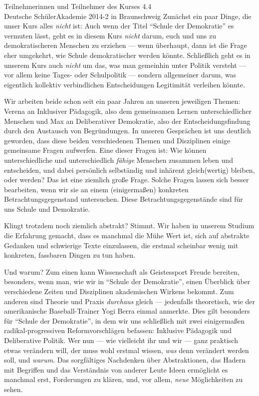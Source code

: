 \documentclass[a4paper]{letter}
\begin{document}
\begin{letter}{
	Teilnehmerinnen und Teilnehmer des Kurses 4.4 \\
	Deutsche SchülerAkademie 2014-2 in Braunschweig}
Zunächst ein paar Dinge, die unser Kurs alles \emph{nicht} ist:
Auch wenn der Titel ``Schule der Demokratie'' es vermuten lässt, geht es in diesem Kurs \emph{nicht} darum, euch und uns zu demokratischeren Menschen zu erziehen --- wenn überhaupt, dann ist die Frage eher umgekehrt, wie Schule demokratischer werden könnte.
Schließlich geht es in unserem Kurs auch \emph{nicht} um das, was man gemeinhin unter Politik versteht --- vor allem keine Tages- oder Schulpolitik --- sondern allgemeiner darum, was eigentlich kollektiv verbindlichen Entscheidungen Legitimität verleihen könnte.

Wir arbeiten beide schon seit ein paar Jahren an unseren jeweiligen Themen: Verena an Inklusiver Pädagogik, also dem gemeinsamen Lernen unterschiedlicher Menschen und Max an Deliberativer Demokratie, also der Entscheidungsfindung durch den Austausch von Begründungen.
In unseren Gesprächen ist uns deutlich geworden, dass diese beiden verschiedenen Themen und Disziplinen einige gemeinsame Fragen aufwerfen.
Eine dieser Fragen ist:
Wie können unterschiedliche und unterschiedlich \emph{fähige} Menschen zusammen leben und entscheiden, und dabei persönlich selbständig und inhärent gleich(wertig) bleiben, oder werden?
Das ist eine ziemlich große Frage.
Solche Fragen lassen sich besser bearbeiten, wenn wir sie an einem (einigermaßen) konkreten Betrachtungsgegenstand untersuchen.
Diese Betrachtungsgegenstände sind für uns Schule und Demokratie.

Klingt trotzdem noch ziemlich abstrakt?
Stimmt. 
Wir haben in unserem Studium die Erfahrung gemacht, dass es manchmal die Mühe Wert ist, sich auf abstrakte Gedanken und schwierige Texte einzulassen, die erstmal scheinbar wenig mit konkreten, fassbaren Dingen zu tun haben.

Und warum? 
Zum einen kann Wissenschaft als Geistessport Freude bereiten, besonders, wenn man, wie wir in ``Schule der Demokratie'', einen Überblick über verschiedene Zeiten und Disziplinen akademischen Wirkens bekommt.
Zum anderen sind Theorie und Praxis \emph{durchaus} gleich --- jedenfalls theoretisch, wie der amerikanische Baseball-Trainer Yogi Berra einmal anmerkte.
Dies gilt besonders für ``Schule der Demokratie'', in dem wir uns schließlich mit zwei einigermaßen radikal-progressiven Reformvorschlägen befassen: Inklusive Pädagogik und Deliberative Politik.
Wer nun --- wie vielleicht ihr und wir --- ganz praktisch etwas verändern will, der muss wohl erstmal wissen, \emph{was} denn verändert werden soll, und \emph{warum}.
Das sorgfältiges Nachdenken über Abstraktionen, das Hadern mit Begriffen und das Verständnis von anderer Leute Ideen ermöglicht es manchmal erst, Forderungen zu klären, und, vor allem, \emph{neue} Möglichkeiten zu sehen.


\end{letter}
\end{document}
